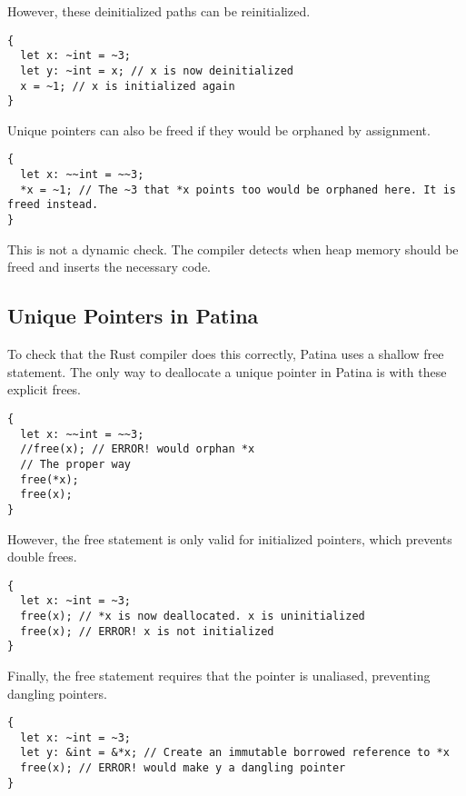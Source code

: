 However, these deinitialized paths can be reinitialized.
\begin{verbatim}
{
  let x: ~int = ~3;
  let y: ~int = x; // x is now deinitialized
  x = ~1; // x is initialized again
}
\end{verbatim}

Unique pointers can also be freed if they would be orphaned by assignment.
\begin{verbatim}
{
  let x: ~~int = ~~3;
  *x = ~1; // The ~3 that *x points too would be orphaned here. It is freed instead.
}
\end{verbatim}

This is not a dynamic check. 
The compiler detects when heap memory should be freed and inserts the necessary code.

\subsection*{Unique Pointers in Patina}
To check that the Rust compiler does this correctly, Patina uses a shallow free statement.
The only way to deallocate a unique pointer in Patina is with these explicit frees.
\begin{verbatim}
{
  let x: ~~int = ~~3;
  //free(x); // ERROR! would orphan *x
  // The proper way
  free(*x);
  free(x);
}
\end{verbatim}
However, the free statement is only valid for initialized pointers, which prevents double frees.
\begin{verbatim}
{
  let x: ~int = ~3;
  free(x); // *x is now deallocated. x is uninitialized
  free(x); // ERROR! x is not initialized
}
\end{verbatim}
Finally, the free statement requires that the pointer is unaliased, preventing dangling pointers.
\begin{verbatim}
{
  let x: ~int = ~3;
  let y: &int = &*x; // Create an immutable borrowed reference to *x
  free(x); // ERROR! would make y a dangling pointer
}
\end{verbatim}

